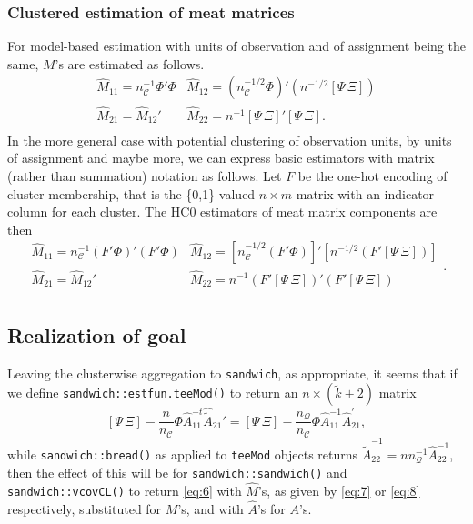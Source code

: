 \documentclass{article}
\begin{document}
  \subsubsection{Clustered estimation of meat matrices}
For model-based estimation with units of observation and of assignment being
the same, $M$'s are estimated as follows.
\begin{equation}\label{eq:7}
  \begin{array}{cc}
  \hat{M}_{11} =n_{\mathcal{C}}^{-1} \Phi'\Phi & \hat{M}_{12} = (n_{\mathcal{C}}^{-1/2}\Phi)'(n^{-1/2} [\Psi\, \Xi])\\
    \hat{M}_{21} =\hat{M}_{12}' & \hat{M}_{22}= n^{-1}[\Psi\, \Xi]'[\Psi\, \Xi].\\
    \end{array}
  \end{equation}
  In the more general case with potential clustering of observation
units, by units of assignment and maybe more, we can express
basic estimators with matrix (rather than summation) notation as
follows. Let
$F$ be the one-hot encoding of cluster membership, that is the \{0,1\}-valued $n \times m$ matrix with an indicator
column for each cluster. The HC0 estimators of meat matrix components
are then
\begin{equation} \label{eq:8}
  \begin{array}{cc}
  \hat{M}_{11} =n_{\mathcal{C}}^{-1} (F'\Phi)'(F'\Phi) & \hat{M}_{12} = [n_{\mathcal{C}}^{-1/2} (F'\Phi)]'[n^{-1/2} (F'[\Psi\, \Xi])]\\
    \hat{M}_{21} =\hat{M}_{12}' & \hat{M}_{22}= n^{-1}(F'[\Psi\, \Xi])'(F'[\Psi\, \Xi])\\
    \end{array}.
  \end{equation}

\subsection{Realization of goal} \label{sec:realization-goal}
Leaving the clusterwise aggregation to \texttt{sandwich}, as
appropriate, it seems that if we define
\texttt{sandwich::estfun.teeMod()} to return an $n \times (\tilde{k}+2)$ matrix
\begin{equation} \label{eq:15}
  [\Psi\, \Xi] -
  \frac{n}{n_{\mathcal{C}}}\Phi
  \hat{A}_{11}^{-t}\hat{\tilde{A}}_{21}' = [\Psi\, \Xi] -
 \frac{n_{\mathcal{Q}}}{n_{\mathcal{C}}}\Phi
 \hat{A}_{11}^{-1}\hat{A}_{21}^{\prime},
\end{equation}
while \texttt{sandwich::bread()} as applied to
\texttt{teeMod} objects returns $\hat{\tilde{A}}_{22}^{-1} = nn_{\mathcal{Q}}^{-1}\hat{A}_{22}^{-1}$, then the effect of this will be for \texttt{sandwich::sandwich()}
and \texttt{sandwich::vcovCL()} to return \eqref{eq:6} with
$\hat{M}$'s,  as
given by \eqref{eq:7} or \eqref{eq:8} respectively, substituted for
$M$'s, and with $\hat{A}$'s for $A$'s.
\end{document}
